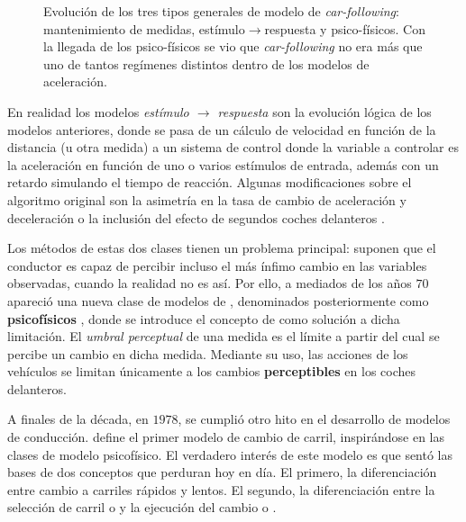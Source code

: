 \begin{figure}[t]
	\begin{center}
		\caption[Evolución de los tres tipos generales de modelo de \textit{car-following}]{Evolución de los tres tipos generales de modelo de \textit{car-following}: mantenimiento de medidas, estímulo$\rightarrow$respuesta y psico-físicos. Con la llegada de los psico-físicos se vio que \textit{car-following} no era más que uno de tantos regímenes distintos dentro de los modelos de aceleración.}
		\label{fig:car-following-there-different-models}
	\end{center}
\end{figure}

En realidad los modelos \textit{estímulo $\rightarrow$ respuesta} son la evolución lógica de los modelos anteriores, donde se pasa de un cálculo de velocidad en función de la distancia (u otra medida) a un sistema de control donde la variable a controlar es la aceleración en función de uno o varios estímulos de entrada, además con un retardo simulando el tiempo de reacción. Algunas modificaciones sobre el algoritmo original son la asimetría en la tasa de cambio de aceleración y deceleración \cite{Gazis1959} o la inclusión del efecto de segundos coches delanteros \cite{Bexelius1968}.

Los métodos de estas dos clases tienen un problema principal: suponen que el conductor es capaz de percibir incluso el más ínfimo cambio en las variables observadas, cuando la realidad no es así. Por ello, a mediados de los años $70$ apareció una nueva clase de modelos de \textit{}, denominados posteriormente como \textbf{psicofísicos} \cite{wiedemann1974simulation}, donde se introduce el concepto de \textit{} como solución a dicha limitación. El \textit{umbral perceptual} de una medida es el límite a partir del cual se percibe un cambio en dicha medida. Mediante su uso, las acciones de los vehículos se limitan únicamente a los cambios \textbf{perceptibles} en los coches delanteros.

A finales de la década, en $1978$, se cumplió otro hito en el desarrollo de modelos de conducción. \cite{Sparmann1978} define el primer modelo de cambio de carril, inspirándose en las clases de modelo psicofísico. El verdadero interés de este modelo es que sentó las bases de dos conceptos que perduran hoy en día. El primero, la diferenciación entre cambio a carriles rápidos y lentos. El segundo, la diferenciación entre la selección de carril o \textit{} y la ejecución del cambio o \textit{}.

